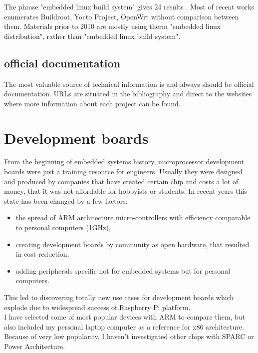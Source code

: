 \documentclass[printmode]{mgr}
\begin{document}
The phrase "embedded linux build system" gives 24 results \cite{web:scholar-2}. Most of recent works enumerates Buildroot, Yocto Project, OpenWrt without comparison between them. Materials prior to 2010 are mostly using therm "embedded linux distribution", rather than "embedded linux build system".


\section{official documentation}

The most valuable source of technical information is and always should be official documentation. URLs are situated in the bibliography and direct to the websites where more information about each project can be found.

\chapter{Development boards}
\label{chapter:development-boards}

From the beginning of embedded systems history, microprocessor development boards were just a training resource for engineers.
Usually they were designed and produced by companies that have created certain chip and costs a lot of money, that it was not affordable for hobbyists or students.
In recent years this state has been changed by a few factors:
\begin{itemize}
  \item the spread of ARM architecture micro-controllers with efficiency comparable to personal computers (1GHz),
  \item creating development boards by community as open hardware, that resulted in cost reduction,
  \item adding peripherals specific not for embedded systems but for personal computers.
\end{itemize}
This led to discovering totally new use cases for development boards which explode due to widespread success of Raspberry Pi platform. \\
I have selected some of most popular devices with ARM to compare them, but also included my personal laptop computer as a reference for x86 architecture. Because of very low popularity, I  haven't investigated other chips with SPARC or Power Architecture. \\
\end{document}
